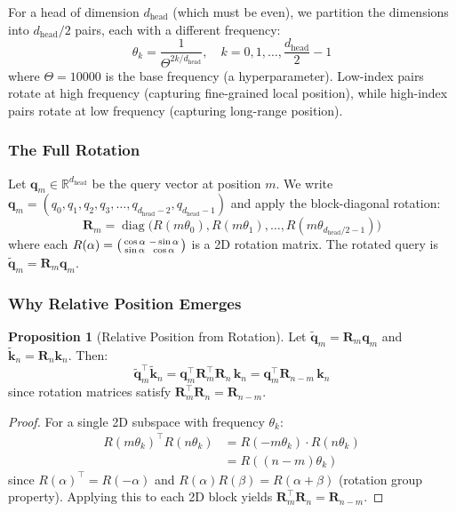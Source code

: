 \documentclass[11pt, a4paper]{article}
\theoremstyle{definition}
\newtheorem{proposition}{Proposition}[section]
\newcommand{\vq}{\bm{q}}
\newcommand{\vk}{\bm{k}}
\newcommand{\mR}{\bm{R}}
\newcommand{\reals}{\mathbb{R}}
\newcommand{\dhead}{d_{\text{head}}}
\DeclareMathOperator{\diag}{diag}
\begin{document}
For a head of dimension $\dhead$ (which must be even), we partition the dimensions into $\dhead/2$ pairs, each with a different frequency:
\begin{equation}\label{eq:rope_freqs}
    \theta_k = \frac{1}{\Theta^{2k/\dhead}}, \quad k = 0, 1, \ldots, \frac{\dhead}{2} - 1
\end{equation}
where $\Theta = 10000$ is the base frequency (a hyperparameter). Low-index pairs rotate at high frequency (capturing fine-grained local position), while high-index pairs rotate at low frequency (capturing long-range position).

\subsubsection{The Full Rotation}

Let $\vq_m \in \reals^{\dhead}$ be the query vector at position $m$. We write $\vq_m = (q_0, q_1, q_2, q_3, \ldots, q_{\dhead-2}, q_{\dhead-1})$ and apply the block-diagonal rotation:
\begin{equation}
    \mR_m = \diag\bigl(R(m\theta_0), R(m\theta_1), \ldots, R(m\theta_{\dhead/2-1})\bigr)
\end{equation}
where each $R(\alpha) = \begin{psmallmatrix} \cos\alpha & -\sin\alpha \\ \sin\alpha & \cos\alpha \end{psmallmatrix}$ is a 2D rotation matrix. The rotated query is $\tilde{\vq}_m = \mR_m \vq_m$.

\subsubsection{Why Relative Position Emerges}

\begin{proposition}[Relative Position from Rotation]
Let $\tilde{\vq}_m = \mR_m \vq_m$ and $\tilde{\vk}_n = \mR_n \vk_n$. Then:
\begin{equation}
    \tilde{\vq}_m^\top \tilde{\vk}_n = \vq_m^\top \mR_m^\top \mR_n \, \vk_n = \vq_m^\top \mR_{n-m} \, \vk_n
\end{equation}
since rotation matrices satisfy $\mR_m^\top \mR_n = \mR_{n-m}$.
\end{proposition}

\begin{proof}
For a single 2D subspace with frequency $\theta_k$:
\begin{align}
    R(m\theta_k)^\top R(n\theta_k) &= R(-m\theta_k) \cdot R(n\theta_k) \\
    &= R((n-m)\theta_k)
\end{align}
since $R(\alpha)^\top = R(-\alpha)$ and $R(\alpha)R(\beta) = R(\alpha + \beta)$ (rotation group property). Applying this to each 2D block yields $\mR_m^\top \mR_n = \mR_{n-m}$.
\end{proof}
\end{document}
